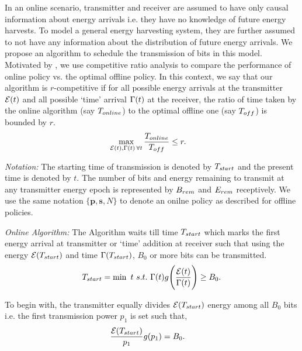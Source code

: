In an online scenario, transmitter and receiver are assumed to have only causal information about energy arrivals i.e. they have no knowledge of future energy harvests. To model a general energy harvesting system, they are further assumed to not have any information about the distribution of future energy arrivals. We propose an algorithm to schedule the transmission of bits in this model. Motivated by \cite{VazeCompetitive}, we use competitive ratio analysis to compare the performance of online policy vs. the optimal offline policy. In this context, we say that our algorithm is $r$-competitive if for all possible energy arrivals at the transmitter $\mathcal{E}(t)$ and all possible `time' arrival $\Gamma(t)$ at the receiver, the ratio of time taken by the online algorithm (say $T_{\mbox{\scriptsize{online}}}$) to the optimal offline one (say $T_{\mbox{\scriptsize{off}}}$) is bounded by $r$.
\begin{align}
&\displaystyle\max_{\ETx(t),\TRx(t)\hspace{0.5mm} \forall t}\dfrac{T_{\mbox{\scriptsize{online}}}}{T_{\mbox{\scriptsize{off}}}}\le r.
\end{align}
 
\textit{Notation:} The starting time of transmission is denoted by $T_{\mbox{\scriptsize{start}}}$ and the present time is denoted by $t$. The number of bits and energy remaining to transmit at any transmitter energy epoch is represented by $B_{\mbox{\scriptsize{rem}}}$ and $E_{\mbox{\scriptsize{rem}}}$ receptively. We use the same notation $\{\bm{p},\bm{s},N\}$ to denote an onilne policy as described for offline policies.

\textit{Online Algorithm:} The Algorithm waits till time $T_{\mbox{\scriptsize{start}}}$ which marks the first energy arrival at transmitter or `time' addition at receiver such that using the energy $\ETx(T_{\mbox{\scriptsize{start}}})$ and time $\TRx(T_{\mbox{\scriptsize{start}}})$, $B_0$ or more bits can be transmitted.
\begin{equation}
T_{\mbox{\scriptsize{start}}}=\min\ t \ s.t.\  \TRx(t)g\Bigg{(} \dfrac{\ETx(t)}{\TRx(t)}\Bigg{)}\ge B_0.\label{online_T_start}
\end{equation}

To begin with, the transmitter equally divides $\ETx(T_{\mbox{\scriptsize{start}}})$ energy among all $B_0$ bits i.e. the first transmission power $p_1$ is set such that,
\begin{align}
&\frac{\ETx(T_{\mbox{\scriptsize{start}}})}{p_1}g(p_1)=B_0.
\label{eq_online_first_power}
\end{align}

